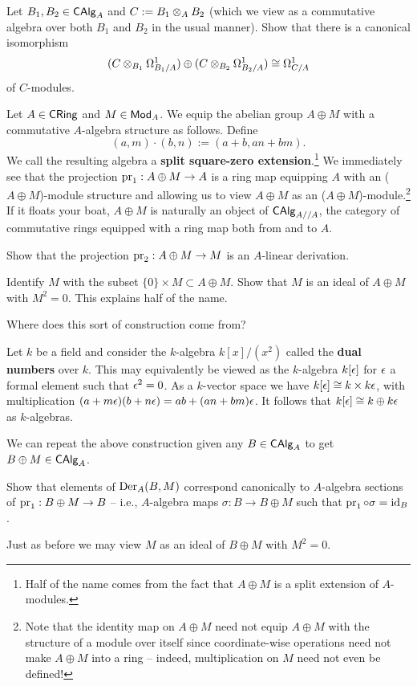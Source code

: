 \documentclass[11pt]{article}
\begin{document}
\begin{exercise}
Let $B_1,B_2\in\operatorname{\mathsf{CAlg}}_A$ and $C:=B_1\otimes_AB_2$ (which we view as a commutative algebra over both $B_1$ and $B_2$ in the usual manner). Show that there is a canonical isomorphism 
$$(C\otimes_{B_1}\Omega_{B_1/A}^1)\oplus(C\otimes_{B_2}\Omega_{B_2/A}^1)\cong\Omega_{C/A}^1$$
of $C$-modules.
\end{exercise}

Let $A\in\operatorname{\mathsf{CRing}}$ and $M\in\operatorname{\mathsf{Mod}}_A$. We equip the abelian group $A\oplus M$ with a commutative $A$-algebra structure as follows. Define
$$(a,m)\cdot(b,n):=(a+b,an+bm).$$
We call the resulting algebra a \textbf{split square-zero extension}.\footnote{Half of the name comes from the fact that $A\oplus M$ is a split extension of $A$-modules.} We immediately see that the projection $\operatorname{pr}_1: A\oplus M\to A$ is a ring map equipping $A$ with an ($A\oplus M$)-module structure and allowing us to view $A\oplus M$ as an ($A\oplus M$)-module.\footnote{Note that the identity map on $A\oplus M$ need not equip $A\oplus M$ with the structure of a module over itself since coordinate-wise operations need not make $A\oplus M$ into a ring -- indeed, multiplication on $M$ need not even be defined!} If it floats your boat, $A\oplus M$ is naturally an object of $\operatorname{\mathsf{CAlg}}_{A//A}$, the category of commutative rings equipped with a ring map both from and to $A$.

\begin{exercise}
Show that the projection $\operatorname{pr}_2: A\oplus M\to M$ is an $A$-linear derivation.
\end{exercise}

\begin{exercise}
Identify $M$ with the subset $\{0\}\times M\subset A\oplus M$. Show that $M$ is an ideal of $A\oplus M$ with $M^2=0$. This explains half of the name.
\end{exercise}

Where does this sort of construction come from?

\begin{example}
Let $k$ be a field and consider the $k$-algebra $k[x]/(x^2)$ called the \textbf{dual numbers} over $k$. This may equivalently be viewed as the $k$-algebra $k[\epsilon]$ for $\epsilon$ a formal element such that $\epsilon^2=0$. As a $k$-vector space we have $k[\epsilon]\cong k\times k\epsilon$, with multiplication $(a+m\epsilon)(b+n\epsilon)=ab+(an+bm)\epsilon$. It follows that $k[\epsilon]\cong k\oplus k\epsilon$ as $k$-algebras.
\end{example}

We can repeat the above construction given any $B\in\operatorname{\mathsf{CAlg}}_A$ to get $B\oplus M\in\operatorname{\mathsf{CAlg}}_A$. 

\begin{exercise}
Show that elements of $\operatorname{Der}_A(B,M)$ correspond canonically to $A$-algebra sections of $\operatorname{pr}_1: B\oplus M\to B$ -- i.e., $A$-algebra maps $\sigma: B\to B\oplus M$ such that $\operatorname{pr}_1\circ\sigma=\operatorname{id}_B$. 
\end{exercise}

Just as before we may view $M$ as an ideal of $B\oplus M$ with $M^2=0$. 
\end{document}
